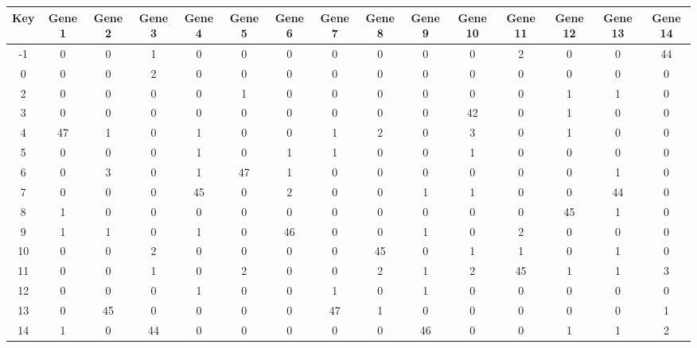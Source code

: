 \begin{tabular}{|c|c|c|c|c|c|c|c|c|c|c|c|c|c|c|}
\hline
Key & Gene 1 & Gene 2 & Gene 3 & Gene 4 & Gene 5 & Gene 6 & Gene 7 & Gene 8 & Gene 9 & Gene 10 & Gene 11 & Gene 12 & Gene 13 & Gene 14 \\
\hline
-1 & 0 & 0 & 1 & 0 & 0 & 0 & 0 & 0 & 0 & 0 & 2 & 0 & 0 & 44 \\
0 & 0 & 0 & 2 & 0 & 0 & 0 & 0 & 0 & 0 & 0 & 0 & 0 & 0 & 0 \\
2 & 0 & 0 & 0 & 0 & 1 & 0 & 0 & 0 & 0 & 0 & 0 & 1 & 1 & 0 \\
3 & 0 & 0 & 0 & 0 & 0 & 0 & 0 & 0 & 0 & 42 & 0 & 1 & 0 & 0 \\
4 & 47 & 1 & 0 & 1 & 0 & 0 & 1 & 2 & 0 & 3 & 0 & 1 & 0 & 0 \\
5 & 0 & 0 & 0 & 1 & 0 & 1 & 1 & 0 & 0 & 1 & 0 & 0 & 0 & 0 \\
6 & 0 & 3 & 0 & 1 & 47 & 1 & 0 & 0 & 0 & 0 & 0 & 0 & 1 & 0 \\
7 & 0 & 0 & 0 & 45 & 0 & 2 & 0 & 0 & 1 & 1 & 0 & 0 & 44 & 0 \\
8 & 1 & 0 & 0 & 0 & 0 & 0 & 0 & 0 & 0 & 0 & 0 & 45 & 1 & 0 \\
9 & 1 & 1 & 0 & 1 & 0 & 46 & 0 & 0 & 1 & 0 & 2 & 0 & 0 & 0 \\
10 & 0 & 0 & 2 & 0 & 0 & 0 & 0 & 45 & 0 & 1 & 1 & 0 & 1 & 0 \\
11 & 0 & 0 & 1 & 0 & 2 & 0 & 0 & 2 & 1 & 2 & 45 & 1 & 1 & 3 \\
12 & 0 & 0 & 0 & 1 & 0 & 0 & 1 & 0 & 1 & 0 & 0 & 0 & 0 & 0 \\
13 & 0 & 45 & 0 & 0 & 0 & 0 & 47 & 1 & 0 & 0 & 0 & 0 & 0 & 1 \\
14 & 1 & 0 & 44 & 0 & 0 & 0 & 0 & 0 & 46 & 0 & 0 & 1 & 1 & 2 \\
\hline
\end{tabular}